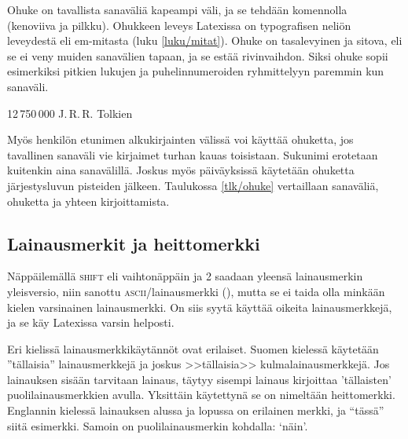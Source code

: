 Ohuke on tavallista sanaväliä kapeampi väli, ja se tehdään
komennolla~\komentom{,} (kenoviiva ja pilkku). Ohukkeen leveys Latexissa
on  typografisen neliön leveydestä eli em-mitasta (luku
\ref{luku/mitat}). Ohuke on tasalevyinen ja sitova, eli se ei veny
muiden sanavälien tapaan, ja se estää rivinvaihdon. Siksi ohuke sopii
esimerkiksi pitkien lukujen ja puhelinnumeroiden ryhmittelyyn paremmin
kun sanaväli.

\komentoi{,}
\begin{koodilohkosis}
12\,750\,000
J.\,R.\,R. Tolkien
\end{koodilohkosis}

\noindent
Myös henkilön etunimen alkukirjainten välissä voi käyttää ohuketta, jos
tavallinen sanaväli vie kirjaimet turhan kauas toisistaan. Sukunimi
erotetaan kuitenkin aina sanavälillä. Joskus myös päiväyksissä käytetään
ohuketta järjestysluvun pisteiden jälkeen. Taulukossa \ref{tlk/ohuke}
vertaillaan sanaväliä, ohuketta ja yhteen kirjoittamista.


\subsection{Lainausmerkit ja heittomerkki}
\label{luku/lainausmerkit}

Näppäilemällä \textsc{shift} eli vaihtonäppäin ja 2 saadaan yleensä
lainausmerkin yleisversio, niin sanottu \textsc{ascii}\-/lainausmerkki
(\textquotedbl), mutta se ei taida olla minkään kielen varsinainen
lainausmerkki. On siis syytä käyttää oikeita lainausmerkkejä, ja se käy
Latexissa varsin helposti.

Eri kielissä lainausmerkkikäytännöt ovat erilaiset. Suomen kielessä
käytetään ''tällaisia'' lainausmerkkejä ja joskus >>tällaisia>>
kulmalainausmerkkejä. Jos lainauksen sisään tarvitaan lainaus, täytyy
sisempi lainaus kirjoittaa 'tällaisten' puolilainausmerkkien avulla.
Yksittäin käytettynä se on nimeltään heittomerkki. Englannin kielessä
lainauksen alussa ja lopussa on erilainen merkki, ja ``tässä'' siitä
esimerkki. Samoin on puolilainausmerkin kohdalla: `näin'.


